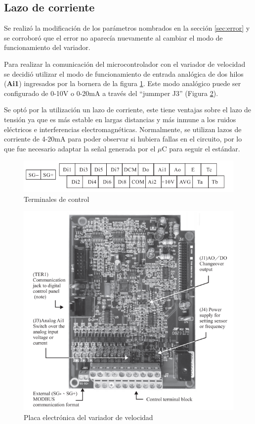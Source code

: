 \subsection{Lazo de corriente} \label{sec:lazoI}

Se realizó la modificación de los parámetros nombrados en la sección \ref{sec:error} y se corroboró que el error no aparecía nuevamente al cambiar el modo de funcionamiento del variador.

Para realizar la comunicación del microcontrolador con el variador de velocidad se decidió utilizar el modo de funcionamiento de entrada analógica de dos hilos (\textbf{Ai1}) ingresados por la bornera de la figura \ref{fig:born}. Este modo analógico puede ser configurado de 0-10V o 0-20mA a través del “jummper J3” (Figura \ref{fig:placals}).

Se optó por la utilización un lazo de corriente, este tiene ventajas sobre el lazo de tensión ya  que es más estable en largas distancias y más inmune a los ruidos eléctricos e interferencias electromagnéticas. Normalmente, se utilizan lazos de corriente de 4-20mA para poder observar si hubiera fallas en el circuito, por lo que fue necesario adaptar la señal generada por el $\mu$C para seguir el estándar.



\begin{figure}[h]
	\centering
	\includegraphics[width=0.7\linewidth]{imagenes/terminales.png}
	\caption{Terminales de control}
	\label{fig:born}
\end{figure}

\begin{figure}[htbp]
	\centering
\includegraphics[width=0.7\linewidth]{imagenes/placa_ls}
\caption{Placa electrónica del variador de velocidad}
\label{fig:placals}
\end{figure}

